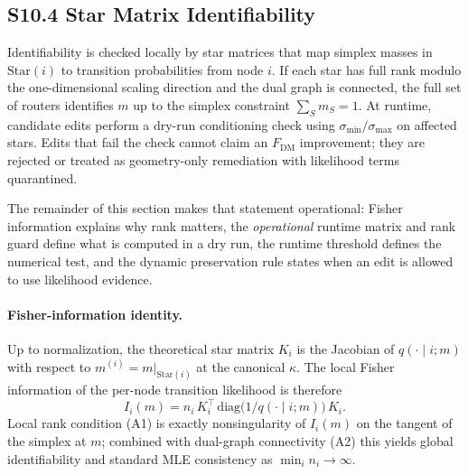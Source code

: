 \documentclass[11pt]{article}
\begin{document}
\subsection*{S10.4 Star Matrix Identifiability}
Identifiability is checked locally by star matrices that map simplex masses in $\mathrm{Star}(i)$ to transition probabilities from node $i$. If each star has full rank modulo the one-dimensional scaling direction and the dual graph is connected, the full set of routers identifies $m$ up to the simplex constraint $\sum_Sm_S=1$. At runtime, candidate edits perform a dry-run conditioning check using $\sigma_{\min}/\sigma_{\max}$ on affected stars. Edits that fail the check cannot claim an $F_{\mathrm{DM}}$ improvement; they are rejected or treated as geometry-only remediation with likelihood terms quarantined.

The remainder of this section makes that statement operational: Fisher information explains why rank matters, the \emph{operational} runtime matrix and rank guard define what is computed in a dry run, the runtime threshold defines the numerical test, and the dynamic preservation rule states when an edit is allowed to use likelihood evidence.

\paragraph{Fisher-information identity.}
Up to normalization, the theoretical star matrix $K_i$ is the Jacobian of $q(\cdot\mid i;m)$ with respect to $m^{(i)}=m\big|_{\mathrm{Star}(i)}$ at the canonical $\kappa$. The local Fisher information of the per-node transition likelihood is therefore
\[
I_i(m)
=
n_i\,K_i^\top\,\mathrm{diag}\!\bigl(1/q(\cdot\mid i;m)\bigr)\,K_i.
\]
Local rank condition (A1) is exactly nonsingularity of $I_i(m)$ on the tangent of the simplex at $m$; combined with dual-graph connectivity (A2) this yields global identifiability and standard MLE consistency as $\min_i n_i\to\infty$.
\end{document}
